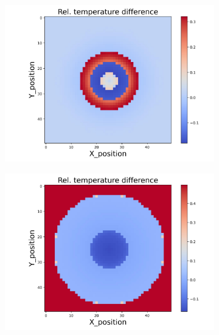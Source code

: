 \begin{figure}[h]
    \begin{minipage}{\textwidth}
        \centering
        \begin{subfigure}{0.325\textwidth}
            \centering
            \includegraphics[width=\textwidth]{figures/raw_data/25/quad/T_bias.jpg}
        \end{subfigure}
        \begin{subfigure}{0.325\textwidth}
            \centering
            \includegraphics[width=\textwidth]{figures/raw_data/26/quad/T_bias.jpg}
        \end{subfigure}
        \begin{subfigure}{0.325\textwidth}

\end{subfigure}
\end{minipage}
\end{figure}
